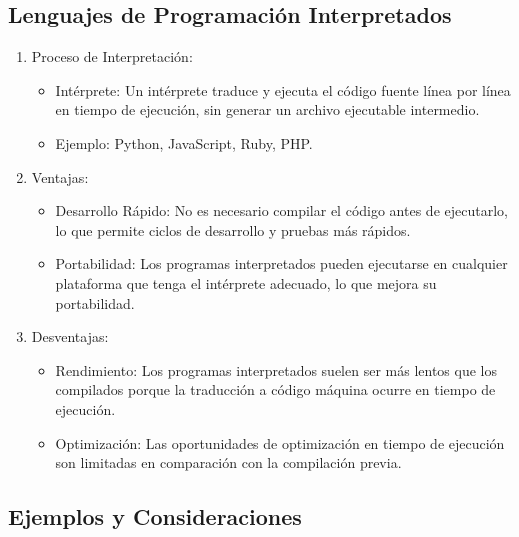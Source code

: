 \subsection{Lenguajes de Programación Interpretados}\label{lenguajes-de-programaciuxf3n-interpretados}

\begin{enumerate}
  \item Proceso de Interpretación:
    \begin{itemize}
      \item
        Intérprete: Un intérprete traduce y ejecuta el código fuente línea por
        línea en tiempo de ejecución, sin generar un archivo ejecutable
        intermedio.
      \item
        Ejemplo: Python, JavaScript, Ruby, PHP.
    \end{itemize}
  \item Ventajas:
    \begin{itemize}
      \item
        Desarrollo Rápido: No es necesario compilar el código antes de
        ejecutarlo, lo que permite ciclos de desarrollo y pruebas más rápidos.
      \item
        Portabilidad: Los programas interpretados pueden ejecutarse en
        cualquier plataforma que tenga el intérprete adecuado, lo que mejora
        su portabilidad.
    \end{itemize}

  \item Desventajas:
    \begin{itemize}
      \item
        Rendimiento: Los programas interpretados suelen ser más lentos que los
        compilados porque la traducción a código máquina ocurre en tiempo de
        ejecución.
      \item
        Optimización: Las oportunidades de optimización en tiempo de ejecución
        son limitadas en comparación con la compilación previa.
    \end{itemize}
  
\end{enumerate}


\subsection{Ejemplos y Consideraciones}\label{ejemplos-y-consideraciones}

